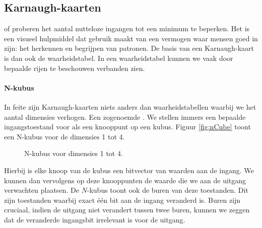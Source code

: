 \subsection{Karnaugh-kaarten}
 of  proberen het aantal nutteloze ingangen tot een minimum te beperken. Het is een visueel hulpmiddel dat gebruik maakt van een vermogen waar mensen goed in zijn: het herkennen en begrijpen van patronen. De basis van een Karnaugh-kaart is dan ook de waarheidstabel. In een waarheidstabel kunnen we vaak door bepaalde rijen te beschouwen verbanden zien.
\paragraph{N-kubus}In feite zijn Karnaugh-kaarten niets anders dan waarheidstabellen waarbij we het aantal dimensies verhogen. Een zogenoemde . We stellen immers een bepaalde ingangstoestand voor als een knooppunt op een kubus. Figuur \ref{fig:nCube} toont een N-kubus voor de dimensies 1 tot 4.
\begin{figure}[htb]
\centering
{}
\caption{N-kubus voor dimensies 1 tot 4.}
\end{figure}
Hierbij is elke knoop van de kubus een bitvector van waarden aan de ingang. We kunnen dan vervolgens op deze knooppunten de waarde die we aan de uitgang verwachten plaatsen. De $N$-kubus toont ook de buren van deze toestanden. Dit zijn toestanden waarbij exact \'e\'en bit aan de ingang veranderd is. Buren zijn cruciaal, indien de uitgang niet verandert tussen twee buren, kunnen we zeggen dat de veranderde ingangsbit irrelevant is voor de uitgang.

